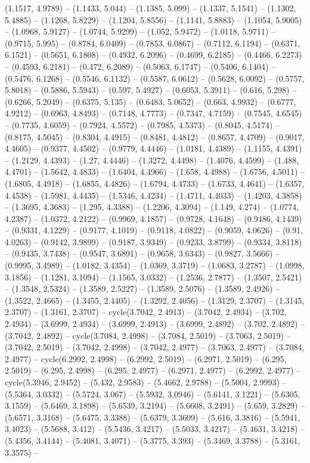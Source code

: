 (1.1517, 4.9789) -- (1.1433, 5.044) -- (1.1385, 5.099) -- (1.1337, 5.1541) -- (1.1302, 5.4885) -- (1.1268, 5.8229) -- (1.1204, 5.8556) -- (1.1141, 5.8883) -- (1.1054, 5.9005) -- (1.0968, 5.9127) -- (1.0744, 5.9299) -- (1.052, 5.9472) -- (1.0118, 5.9711) -- (0.9715, 5.995) -- (0.8784, 6.0409) -- (0.7853, 6.0867) -- (0.7112, 6.1194) -- (0.6371, 6.1521) -- (0.5651, 6.1808) -- (0.4932, 6.2096) -- (0.4699, 6.2185) -- (0.4466, 6.2273) -- (0.4593, 6.2181) -- (0.472, 6.2089) -- (0.5063, 6.1747) -- (0.5406, 6.1404) -- (0.5476, 6.1268) -- (0.5546, 6.1132) -- (0.5587, 6.0612) -- (0.5628, 6.0092) -- (0.5757, 5.8018) -- (0.5886, 5.5943) -- (0.597, 5.4927) -- (0.6053, 5.3911) -- (0.616, 5.298) -- (0.6266, 5.2049) -- (0.6375, 5.135) -- (0.6483, 5.0652) -- (0.663, 4.9932) -- (0.6777, 4.9212) -- (0.6963, 4.8493) -- (0.7148, 4.7773) -- (0.7347, 4.7159) -- (0.7545, 4.6545) -- (0.7735, 4.6059) -- (0.7924, 4.5572) -- (0.7985, 4.5373) -- (0.8045, 4.5174) -- (0.8175, 4.5045) -- (0.8304, 4.4915) -- (0.8481, 4.4812) -- (0.8657, 4.4709) -- (0.9017, 4.4605) -- (0.9377, 4.4502) -- (0.9779, 4.4446) -- (1.0181, 4.4389) -- (1.1155, 4.4391) -- (1.2129, 4.4393) -- (1.27, 4.4446) -- (1.3272, 4.4498) -- (1.4076, 4.4599) -- (1.488, 4.4701) -- (1.5642, 4.4833) -- (1.6404, 4.4966) -- (1.658, 4.4988) -- (1.6756, 4.5011) -- (1.6805, 4.4918) -- (1.6855, 4.4826) -- (1.6794, 4.4733) -- (1.6733, 4.4641) -- (1.6357, 4.4538) -- (1.5981, 4.4435) -- (1.5346, 4.4234) -- (1.4711, 4.4033) -- (1.4203, 4.3858) -- (1.3695, 4.3683) -- (1.295, 4.3388) -- (1.2206, 4.3094) -- (1.149, 4.274) -- (1.0774, 4.2387) -- (1.0372, 4.2122) -- (0.9969, 4.1857) -- (0.9728, 4.1648) -- (0.9486, 4.1439) -- (0.9331, 4.1229) -- (0.9177, 4.1019) -- (0.9118, 4.0822) -- (0.9059, 4.0626) -- (0.91, 4.0263) -- (0.9142, 3.9899) -- (0.9187, 3.9349) -- (0.9233, 3.8799) -- (0.9334, 3.8118) -- (0.9435, 3.7438) -- (0.9547, 3.6891) -- (0.9658, 3.6343) -- (0.9827, 3.5666) -- (0.9995, 3.4989) -- (1.0182, 3.4354) -- (1.0369, 3.3719) -- (1.0683, 3.2787) -- (1.0998, 3.1856) -- (1.1281, 3.1094) -- (1.1565, 3.0332) -- (1.2536, 2.7877) -- (1.3507, 2.5421) -- (1.3548, 2.5324) -- (1.3589, 2.5227) -- (1.3589, 2.5076) -- (1.3589, 2.4926) -- (1.3522, 2.4665) -- (1.3455, 2.4405) -- (1.3292, 2.4056) -- (1.3129, 2.3707) -- (1.3145, 2.3707) -- (1.3161, 2.3707) -- cycle(3.7042, 2.4913) -- (3.7042, 2.4934) -- (3.702, 2.4934) -- (3.6999, 2.4934) -- (3.6999, 2.4913) -- (3.6999, 2.4892) -- (3.702, 2.4892) -- (3.7042, 2.4892) -- cycle(3.7084, 2.4998) -- (3.7084, 2.5019) -- (3.7063, 2.5019) -- (3.7042, 2.5019) -- (3.7042, 2.4998) -- (3.7042, 2.4977) -- (3.7063, 2.4977) -- (3.7084, 2.4977) -- cycle(6.2992, 2.4998) -- (6.2992, 2.5019) -- (6.2971, 2.5019) -- (6.295, 2.5019) -- (6.295, 2.4998) -- (6.295, 2.4977) -- (6.2971, 2.4977) -- (6.2992, 2.4977) -- cycle(5.3946, 2.9452) -- (5.432, 2.9583) -- (5.4662, 2.9788) -- (5.5004, 2.9993) -- (5.5364, 3.0332) -- (5.5724, 3.067) -- (5.5932, 3.0946) -- (5.6141, 3.1221) -- (5.6305, 3.1559) -- (5.6469, 3.1898) -- (5.6539, 3.2194) -- (5.6608, 3.2491) -- (5.659, 3.2829) -- (5.6571, 3.3168) -- (5.6475, 3.3388) -- (5.6379, 3.3609) -- (5.616, 3.3816) -- (5.5941, 3.4023) -- (5.5688, 3.412) -- (5.5436, 3.4217) -- (5.5033, 3.4217) -- (5.4631, 3.4218) -- (5.4356, 3.4144) -- (5.4081, 3.4071) -- (5.3775, 3.393) -- (5.3469, 3.3788) -- (5.3161, 3.3575) -- 